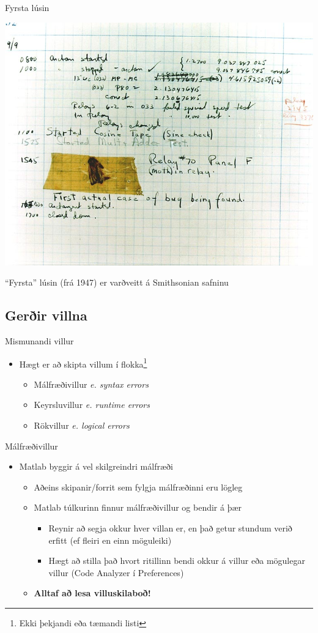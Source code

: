 \documentclass{beamer}
\begin{document}
\begin{frame}{Fyrsta lúsin}
\begin{center}
\includegraphics[width=0.7\linewidth]{../Pics/first-bug}

``Fyrsta'' lúsin (frá 1947) er varðveitt á Smithsonian safninu
\end{center}
\end{frame}

\subsection{Gerðir villna}

\begin{frame}{Mismunandi villur}
\begin{itemize}
 \item Hægt er að skipta villum í flokka\footnote{Ekki þekjandi eða tæmandi listi}
 \begin{itemize}
  \item Málfræðivillur \emph{e. syntax errors}
  \item Keyrsluvillur \emph{e. runtime errors}
  \item Rökvillur \emph{e. logical errors}
 \end{itemize}
\end{itemize}

\end{frame}

\begin{frame}{Málfræðivillur}
\begin{itemize}
 \item Matlab byggir á vel skilgreindri málfræði
 \begin{itemize}
  \item Aðeins skipanir/forrit sem fylgja málfræðinni eru lögleg
  \item Matlab túlkurinn finnur málfræðivillur og bendir á þær
  \begin{itemize}
   \item Reynir að segja okkur hver villan er, en það getur stundum verið erfitt (ef fleiri en einn möguleiki)
   \item Hægt að stilla það hvort ritillinn bendi okkur á villur eða mögulegar villur (Code Analyzer í Preferences)
  \end{itemize}
  \item \textbf{Alltaf að lesa villuskilaboð!}
 \end{itemize}
\end{itemize}
\end{frame}
\end{document}
